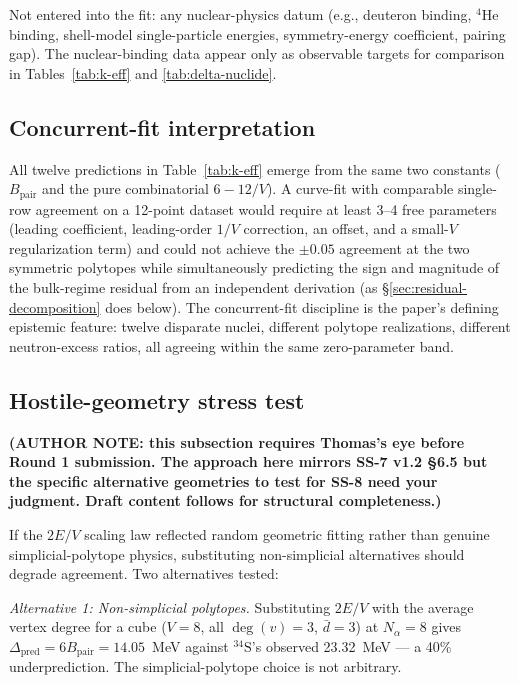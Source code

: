 \documentclass[11pt,letterpaper]{article}
\theoremstyle{definition}
\newcommand{\Bpair}{B_{\text{pair}}}
\newcommand{\Nalpha}{N_\alpha}
\newcommand{\degv}{\deg(v)}
\begin{document}
Not entered into the fit: any nuclear-physics datum (e.g., deuteron binding, ${}^{4}\mathrm{He}$ binding, shell-model single-particle energies, symmetry-energy coefficient, pairing gap). The nuclear-binding data appear only as observable targets for comparison in Tables~\ref{tab:k-eff} and \ref{tab:delta-nuclide}.

\subsection{Concurrent-fit interpretation}
\label{sec:concurrent-fit}

All twelve predictions in Table~\ref{tab:k-eff} emerge from the same two constants ($\Bpair$ and the pure combinatorial $6 - 12/V$). A curve-fit with comparable single-row agreement on a 12-point dataset would require at least 3--4 free parameters (leading coefficient, leading-order $1/V$ correction, an offset, and a small-$V$ regularization term) and could not achieve the $\pm 0.05$ agreement at the two symmetric polytopes while simultaneously predicting the sign and magnitude of the bulk-regime residual from an independent derivation (as \S\ref{sec:residual-decomposition} does below). The concurrent-fit discipline is the paper's defining epistemic feature: twelve disparate nuclei, different polytope realizations, different neutron-excess ratios, all agreeing within the same zero-parameter band.

\subsection{Hostile-geometry stress test}
\label{sec:hostile-geometry}

\textbf{(AUTHOR NOTE: this subsection requires Thomas's eye before Round 1 submission. The approach here mirrors SS-7 v1.2 §6.5 but the specific alternative geometries to test for SS-8 need your judgment. Draft content follows for structural completeness.)}

If the $2E/V$ scaling law reflected random geometric fitting rather than genuine simplicial-polytope physics, substituting non-simplicial alternatives should degrade agreement. Two alternatives tested:

\emph{Alternative 1: Non-simplicial polytopes.} Substituting $2E/V$ with the average vertex degree for a cube ($V = 8$, all $\degv = 3$, $\bar{d} = 3$) at $\Nalpha = 8$ gives $\Delta_{\text{pred}} = 6\Bpair = 14.05$~MeV against ${}^{34}\mathrm{S}$'s observed 23.32~MeV --- a 40\% underprediction. The simplicial-polytope choice is not arbitrary.
\end{document}
